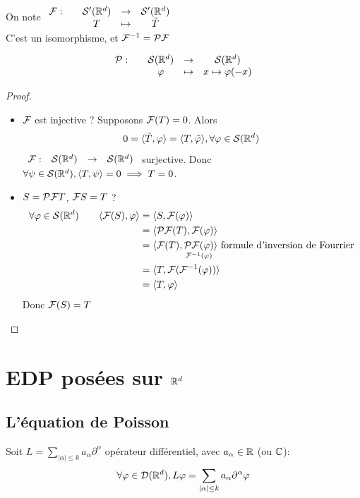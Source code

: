 \documentclass[]{report}
\begin{document}
    \begin{prop}{}{}
        On note $\begin{array}{ccccc} \mathcal{F} : & & \mathcal{S}'(\mathbb{R}^d) & \to & \mathcal{S}'(\mathbb{R}^d) \\ & & T & \mapsto & \tilde{T} \end{array}$\\
        C'est un isomorphisme, et $\mathcal{F}^{-1}=\mathcal{P}\mathcal{F}$
    \end{prop}

    \begin{ra}{}{}
        \[\begin{array}{ccccc} \mathcal{P} : & & \mathcal{S}(\mathbb{R}^d) & \to & \mathcal{S}(\mathbb{R}^d) \\ & & \varphi & \mapsto & x\mapsto \varphi(-x) \end{array}\]
    \end{ra}

    \begin{proof}
        \begin{itemize}
            \item $\mathcal{F}$ est injective ? Supposons $\mathcal{F}(T)=0$. Alors
            \[0=\langle \tilde{T},\varphi \rangle=\langle T,\tilde{\varphi} \rangle,\forall \varphi\in \mathcal{S}(\mathbb{R}^d)\]
            $\begin{array}{ccccc} \mathcal{F} : & \mathcal{S}(\mathbb{R}^d) & \to & \mathcal{S}(\mathbb{R}^d) \end{array}$ surjective. Donc $\forall \psi\in \mathcal{S}(\mathbb{R}^d),\langle T,\psi \rangle=0\implies T=0$.
            \item $S=\mathcal{P}\mathcal{F} T$, $\mathcal{F} S=T$ ?
            \begin{align*}
                \forall \varphi\in \mathcal{S}(\mathbb{R}^d)\qquad \langle \mathcal{F}(S),\varphi \rangle&=\langle S,\mathcal{F}(\varphi) \rangle\\
                &=\langle \mathcal{P}\mathcal{F}(T),\mathcal{F}(\varphi) \rangle\\
                &=\langle \mathcal{F}(T),\underset{\mathcal{F}^{-1}(\varphi)}{\mathcal{P}\mathcal{F}(\varphi)} \rangle\text{ formule d'inversion de Fourrier}\\
                &=\langle T,\mathcal{F}(\mathcal{F}^{-1}(\varphi)) \rangle\\
                &=\langle T,\varphi \rangle
            \end{align*}
            Donc $\mathcal{F}(S)=T$
        \end{itemize}
    \end{proof}

    \chapter{EDP posées sur $\mathbb{R}^d$}

    \section{L'équation de Poisson}

    Soit $L=\sum_{|\alpha|\le k}a_\alpha \partial^\alpha$ opérateur différentiel, avec $a_\alpha\in \mathbb{R}$ (ou $\mathbb{C}$):
    \[\forall \varphi\in \mathcal{D}(\mathbb{R}^d),L\varphi=\sum_{|\alpha|\le k}a_\alpha \partial^\alpha \varphi\]
\end{document}
